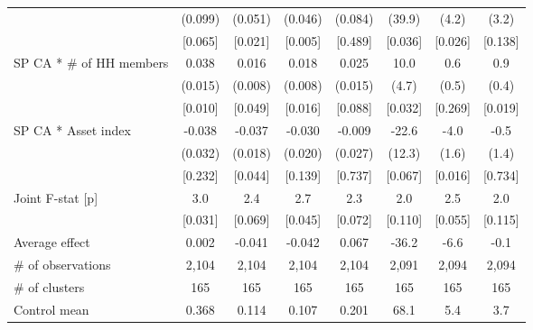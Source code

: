 \begin{tabular}{lccccccc}
 & (0.099) & (0.051) & (0.046) & (0.084) & (39.9) & (4.2) & (3.2) \\
 & [0.065] & [0.021] & [0.005] & [0.489] & [0.036] & [0.026] & [0.138] \\
SP CA * \# of HH members & 0.038 & 0.016 & 0.018 & 0.025 & 10.0 & 0.6 & 0.9 \\
 & (0.015) & (0.008) & (0.008) & (0.015) & (4.7) & (0.5) & (0.4) \\
 & [0.010] & [0.049] & [0.016] & [0.088] & [0.032] & [0.269] & [0.019] \\
SP CA * Asset index & -0.038\hphantom{-} & -0.037\hphantom{-} & -0.030\hphantom{-} & -0.009\hphantom{-} & -22.6\hphantom{-} & -4.0\hphantom{-} & -0.5\hphantom{-} \\
 & (0.032) & (0.018) & (0.020) & (0.027) & (12.3) & (1.6) & (1.4) \\
 & [0.232] & [0.044] & [0.139] & [0.737] & [0.067] & [0.016] & [0.734] \\
Joint F-stat [p] & 3.0 & 2.4 & 2.7 & 2.3 & 2.0 & 2.5 & 2.0 \\
 & [0.031] & [0.069] & [0.045] & [0.072] & [0.110] & [0.055] & [0.115] \\
\cmidrule(lr){1-8}
Average effect & 0.002 & -0.041 & -0.042 & 0.067 & -36.2 & -6.6 & -0.1 \\
\hline
\# of observations & 2,104 & 2,104 & 2,104 & 2,104 & 2,091 & 2,094 & 2,094 \\
\# of clusters & 165 & 165 & 165 & 165 & 165 & 165 & 165 \\
Control mean & 0.368 & 0.114 & 0.107 & 0.201 & 68.1 & 5.4 & 3.7 \\
\hline
\end{tabular}
